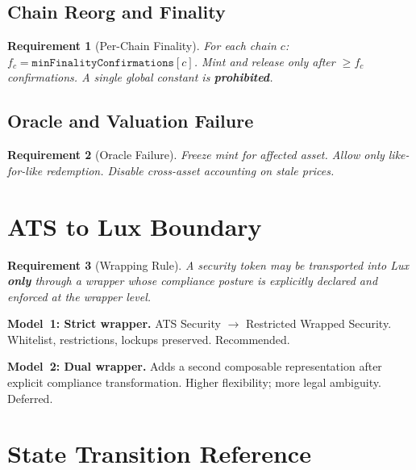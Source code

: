 \documentclass[11pt,twocolumn]{article}
\newtheorem{requirement}{Requirement}[section]
\theoremstyle{remark}
\begin{document}
\subsection{Chain Reorg and Finality}
\label{sec:finality}

\begin{requirement}[Per-Chain Finality]
For each chain $c$: $f_c = \texttt{minFinalityConfirmations}[c]$. Mint and release only after $\geq f_c$ confirmations. A single global constant is \textbf{prohibited}.
\end{requirement}

\subsection{Oracle and Valuation Failure}

\begin{requirement}[Oracle Failure]
Freeze mint for affected asset. Allow only like-for-like redemption. Disable cross-asset accounting on stale prices.
\end{requirement}


\section{ATS to Lux Boundary}
\label{sec:ats-boundary}

\begin{requirement}[Wrapping Rule]
A security token may be transported into Lux \textbf{only} through a wrapper whose compliance posture is explicitly declared and enforced at the wrapper level.
\end{requirement}

\noindent\textbf{Model~1: Strict wrapper.} ATS Security $\to$ Restricted Wrapped Security. Whitelist, restrictions, lockups preserved. Recommended.

\noindent\textbf{Model~2: Dual wrapper.} Adds a second composable representation after explicit compliance transformation. Higher flexibility; more legal ambiguity. Deferred.


\section{State Transition Reference}
\label{sec:transitions}
\end{document}

